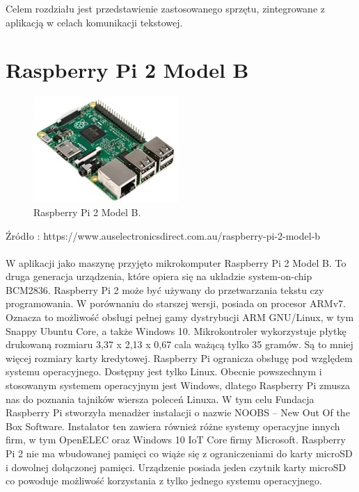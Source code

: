 Celem rozdziału jest przedstawienie zastosowanego sprzętu, zintegrowane z aplikacją w celach komunikacji tekstowej.
\section{Raspberry Pi 2 Model B} 
\begin{figure}[htbp]
	\centering
	\includegraphics[width=0.7\linewidth]{"obrazy/Raspberry Pi"}
	\caption{Raspberry Pi 2 Model B.}
	\label{fig:1}
\end{figure}
Źródło : https://www.auselectronicsdirect.com.au/raspberry-pi-2-model-b
\\
\\
W aplikacji jako maszynę przyjęto mikrokomputer Raspberry Pi 2 Model B. To druga generacja urządzenia, które opiera się na układzie system-on-chip BCM2836. Raspberry Pi 2 może być używany do przetwarzania tekstu czy programowania. W porównaniu do starszej wersji, posiada on procesor ARMv7. Oznacza to możliwość obsługi pełnej gamy dystrybucji ARM GNU/Linux,  w tym Snappy Ubuntu Core, a także Windows 10. Mikrokontroler wykorzystuje płytkę drukowaną rozmiaru 3,37 x 2,13 x 0,67 cala ważącą tylko 35 gramów. Są to mniej więcej rozmiary karty kredytowej. Raspberry Pi ogranicza obsługę pod względem systemu operacyjnego. Dostępny jest tylko Linux. Obecnie powszechnym i stosowanym systemem operacyjnym jest Windows, dlatego Raspberry Pi zmusza nas do poznania tajników wiersza poleceń Linuxa. W tym celu Fundacja Raspberry Pi stworzyła menadżer instalacji o nazwie NOOBS – New Out Of the Box Software. Instalator ten zawiera również różne systemy operacyjne innych firm, w tym OpenELEC oraz Windows 10 IoT Core firmy Microsoft. Raspberry Pi 2 nie ma wbudowanej pamięci co wiąże się z ograniczeniami do karty microSD i dowolnej dołączonej pamięci. Urządzenie posiada jeden czytnik karty microSD co powoduje możliwość korzystania z tylko jednego systemu operacyjnego.

